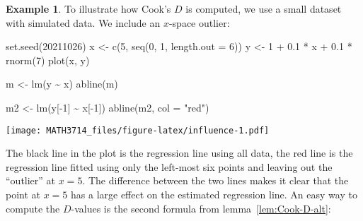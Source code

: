\documentclass[
  a4paper,
]{article}
\newenvironment{Shaded}{\begin{snugshade}}{\end{snugshade}}
\newcommand{\AttributeTok}[1]{\textcolor[rgb]{0.77,0.63,0.00}{#1}}
\newcommand{\DecValTok}[1]{\textcolor[rgb]{0.00,0.00,0.81}{#1}}
\newcommand{\FloatTok}[1]{\textcolor[rgb]{0.00,0.00,0.81}{#1}}
\newcommand{\FunctionTok}[1]{\textcolor[rgb]{0.00,0.00,0.00}{#1}}
\newcommand{\NormalTok}[1]{#1}
\newcommand{\OtherTok}[1]{\textcolor[rgb]{0.56,0.35,0.01}{#1}}
\newcommand{\SpecialCharTok}[1]{\textcolor[rgb]{0.00,0.00,0.00}{#1}}
\newcommand{\StringTok}[1]{\textcolor[rgb]{0.31,0.60,0.02}{#1}}
\theoremstyle{definition}
\theoremstyle{definition}
\newtheorem{example}{Example}[section]
\theoremstyle{definition}
\theoremstyle{definition}
\theoremstyle{remark}
\begin{document}
\begin{example}
To illustrate how Cook's \(D\) is computed, we use a small dataset with
simulated data. We include an \(x\)-space outlier:

\begin{Shaded}
\begin{Highlighting}[]
\FunctionTok{set.seed}\NormalTok{(}\DecValTok{20211026}\NormalTok{)}
\NormalTok{x }\OtherTok{\textless{}{-}} \FunctionTok{c}\NormalTok{(}\DecValTok{5}\NormalTok{, }\FunctionTok{seq}\NormalTok{(}\DecValTok{0}\NormalTok{, }\DecValTok{1}\NormalTok{, }\AttributeTok{length.out =} \DecValTok{6}\NormalTok{))}
\NormalTok{y }\OtherTok{\textless{}{-}} \DecValTok{1} \SpecialCharTok{+} \FloatTok{0.1} \SpecialCharTok{*}\NormalTok{ x }\SpecialCharTok{+} \FloatTok{0.1} \SpecialCharTok{*} \FunctionTok{rnorm}\NormalTok{(}\DecValTok{7}\NormalTok{)}
\FunctionTok{plot}\NormalTok{(x, y)}

\NormalTok{m }\OtherTok{\textless{}{-}} \FunctionTok{lm}\NormalTok{(y }\SpecialCharTok{\textasciitilde{}}\NormalTok{ x)}
\FunctionTok{abline}\NormalTok{(m)}

\NormalTok{m2 }\OtherTok{\textless{}{-}} \FunctionTok{lm}\NormalTok{(y[}\SpecialCharTok{{-}}\DecValTok{1}\NormalTok{] }\SpecialCharTok{\textasciitilde{}}\NormalTok{ x[}\SpecialCharTok{{-}}\DecValTok{1}\NormalTok{])}
\FunctionTok{abline}\NormalTok{(m2, }\AttributeTok{col =} \StringTok{"red"}\NormalTok{)}
\end{Highlighting}
\end{Shaded}

\texttt{[image: MATH3714\_files/figure-latex/influence-1.pdf]}

The black line in the plot is the regression line using all data,
the red line is the regression line fitted using only the left-most
six points and leaving out the ``outlier'' at \(x=5\). The difference
between the two lines makes it clear that the point at \(x=5\) has a
large effect on the estimated regression line. An easy way
to compute the \(D\)-values is the second formula from
lemma~\ref{lem:Cook-D-alt}:

\begin{Shaded}
\end{Shaded}


\end{example}
\end{document}
